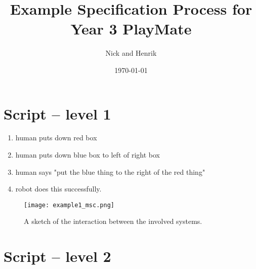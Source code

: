 \documentclass{article}
\title{Example Specification Process for Year 3 PlayMate}
\date{\today}
\author{Nick and Henrik}
\begin{document}
\maketitle

\section{Script -- level 1}

\begin{enumerate}
\item \label{lvl1:redbox}
  human puts down red box
\item \label{lvl1:bluebox}
  human puts down blue box to left of right box
\item \label{lvl1:human}
  human says "put the blue thing to the right of the red thing"
\item \label{lvl1:success}
  robot does this successfully.
\end{enumerate}

\begin{figure}[ht]
\centering
\texttt{[image: example1\_msc.png]}
\caption{
A sketch of the interaction between the involved systems.
}
\label{fig:lvl1}
\end{figure}


\section{Script -- level 2}
\end{document}

